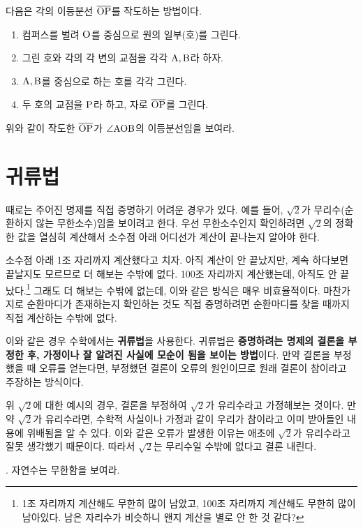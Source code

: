 다음은 각의 이등분선 \(\overline{\rm{OP}}\)를 작도하는 방법이다.
\begin{enumerate}
    \item 컴퍼스를 벌려 \(\rm{O}\)를 중심으로 원의 일부(호)를 그린다.
    \item 그린 호와 각의 각 변의 교점을 각각 \(\rm{A}, \rm{B}\)라 하자.
    \item \(\rm{A}, \rm{B}\)를 중심으로 하는 호를 각각 그린다.
    \item 두 호의 교점을 \(\rm{P}\)라 하고, 자로 \(\overline{\rm{OP}}\)를 그린다.
\end{enumerate}
위와 같이 작도한 \(\overline{\rm{OP}}\)가 \(\angle \rm{AOB}\)의 이등분선임을 보여라.

\pagebreak

\section{귀류법}

때로는 주어진 명제를 직접 증명하기 어려운 경우가 있다. 예를 들어, \(\sqrt{2}\)가 무리수(순환하지 않는 무한소수)임을 보이려고 한다. 우선 무한소수인지 확인하려면 \(\sqrt{2}\)의 정확한 값을 열심히 계산해서 소수점 아래 어디선가 계산이 끝나는지 알아야 한다.

소수점 아래 1조 자리까지 계산했다고 치자. 아직 계산이 안 끝났지만, 계속 하다보면 끝날지도 모르므로 더 해보는 수밖에 없다. 100조 자리까지 계산했는데, 아직도 안 끝났다.\footnote{1조 자리까지 계산해도 무한히 많이 남았고, 100조 자리까지 계산해도 무한히 많이 남아있다. 남은 자리수가 비슷하니 왠지 계산을 별로 안 한 것 같다?} 그래도 더 해보는 수밖에 없는데, 이와 같은 방식은 매우 비효율적이다. 마찬가지로 순환마디가 존재하는지 확인하는 것도 직접 증명하려면 순환마디를 찾을 때까지 직접 계산하는 수밖에 없다.

이와 같은 경우 수학에서는 \textbf{귀류법}을 사용한다. 귀류법은 \textbf{증명하려는 명제의 결론을 부정한 후, 가정이나 잘 알려진 사실에 모순이 됨을 보이는 방법}이다. 만약 결론을 부정했을 때 오류를 얻는다면, 부정했던 결론이 오류의 원인이므로 원래 결론이 참이라고 주장하는 방식이다.

위 \(\sqrt{2}\)에 대한 예시의 경우, 결론을 부정하여 \(\sqrt{2}\)가 유리수라고 가정해보는 것이다. 만약 \(\sqrt{2}\)가 유리수라면, 수학적 사실이나 가정과 같이 우리가 참이라고 이미 받아들인 내용에 위배됨을 알 수 있다. 이와 같은 오류가 발생한 이유는 애초에 \(\sqrt{2}\)가 유리수라고 잘못 생각했기 때문이다. 따라서 \(\sqrt{2}\)는 무리수일 수밖에 없다고 결론 내린다.

\ex. 자연수는 무한함을 보여라.

